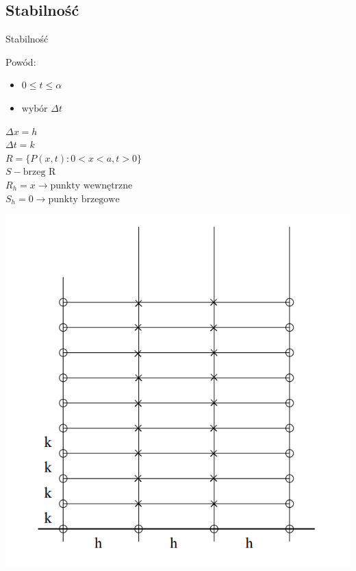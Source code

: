 
\subsection{Stabilność}
\begin{frame}{Stabilność}
  \begin{block}{Powód:}
\begin{itemize}
    \item $ 0  \le t \leq \alpha $
    \item $\text{wybór } \Delta t $
\end{itemize}
  \end{block}
    
      $\Delta x = h $ \\
      $\Delta t = k$ \\
      $ R = \{P(x,t): 0 < x < a, t > 0\}$ \\
      $S - \text{brzeg R}$ \\
      $R_h = x \rightarrow \text{punkty wewnętrzne}$ \\
      $S_h = 0 \rightarrow \text{punkty brzegowe}$
  \end{frame}

\begin{frame}
  \centerline{\includegraphics[height = 0.85 \textheight]{img/23/stabilnosc}}
\end{frame}

